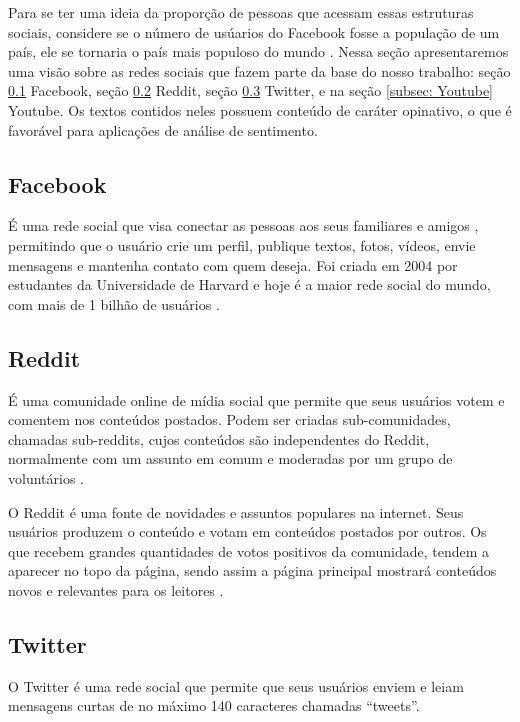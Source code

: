 Para se ter uma ideia da proporção de pessoas que acessam essas estruturas sociais, considere se o número de usúarios do Facebook fosse a população de um país, ele se tornaria o país mais populoso do mundo \cite{facebookPais}.
Nessa seção apresentaremos uma visão sobre as redes sociais que fazem parte da base do nosso trabalho:  seção \ref{subsec: Facebook} Facebook, seção \ref{subsec: Reddit} Reddit, seção \ref {subsec: Twitter} Twitter, e na seção \ref{subsec: Youtube}  Youtube. Os textos contidos neles possuem conteúdo de caráter opinativo, o que é favorável para aplicações de análise de sentimento.

    \subsection{Facebook}
    \label{subsec: Facebook}
É uma rede social que visa conectar as pessoas aos seus familiares e amigos \cite{FBnewsroom}, permitindo que o usuário crie um perfil, publique textos, fotos, vídeos, envie mensagens e mantenha contato com quem deseja. Foi criada em 2004 por estudantes da Universidade de Harvard e hoje é a maior rede social do mundo, com mais de 1 bilhão de usuários \cite{Facebook101}.

    \subsection{Reddit}
    \label{subsec: Reddit}
É uma comunidade online de mídia social que permite que seus usuários votem e comentem nos conteúdos postados. Podem ser criadas sub-comunidades, chamadas sub-reddits, cujos conteúdos são independentes do Reddit, normalmente com um assunto em comum e moderadas por um grupo de voluntários \cite{WhatIsReddit}. \par
O Reddit é uma fonte de novidades e assuntos populares na internet. Seus usuários produzem o conteúdo e votam em conteúdos postados por outros. Os que recebem grandes quantidades de votos positivos da comunidade, tendem a aparecer no topo da página, sendo assim a página principal mostrará conteúdos novos e relevantes para os leitores \cite{RedditWiki}.
    
    \subsection{Twitter}
    \label{subsec: Twitter}
O Twitter é uma rede social que permite que seus usuários enviem e leiam mensagens curtas de no máximo 140 caracteres chamadas “tweets”.

